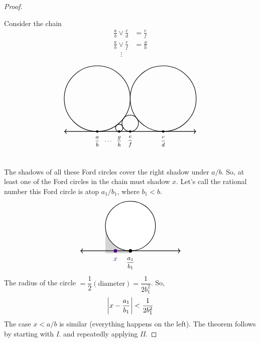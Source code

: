 \begin{proof}
\begin{subproof}
\end{subproof}
\vspace*{0.5em}
\begin{minipage}{0.4\textwidth}
Consider the chain
\vspace*{0.3em}
\begin{align*}
\frac{a}{b} \vee \frac{c}{d} &= \frac{e}{f}\\[0.5em]
\frac{a}{b} \vee \frac{e}{f} &= \frac{g}{h}\\[0.1em]
\quad\vdots
\end{align*}
\end{minipage}
\begin{minipage}{0.6\textwidth}
\[\begin{tikzpicture}[scale=3.3]
    \draw[thick](-2,0.5) circle (0.5);
    \draw[thick](-1,0.5) circle (0.5);
    \draw[thick](-1.5,0.125) circle (0.125);
    \draw[thick](-1.66666,0.0555) circle (0.0555);
    \draw[<->,thick] (-2.5,0)--(-0.5,0);
    \foreach \x in {-2,-1.5,-1.66666,-1}
    {
    \fill (\x,0) circle (0.5pt);
    }
    \node[] at (-2,-0.15) {\footnotesize $\dfrac{a}{b}$};
    \node[] at (-1,-0.15) {\footnotesize $\dfrac{c}{d}$};
    \node[] at (-1.5,-0.15) {\footnotesize $\dfrac{e}{f}$};
    \node[] at (-1.66666,-0.15) {\footnotesize $\dfrac{g}{h}$};
    \node[] at (-1.825,-0.15) {\footnotesize $\cdots$};
\end{tikzpicture}\]
\end{minipage}
\vspace*{0.5em}\\
The shadows of all these Ford circles cover the right shadow under $a/b$. So, at least one of the Ford circles in the chain must shadow $x$. Let's call the rational number this Ford circle is atop $a_1/b_1$, where $b_1 < b$.
\[\begin{tikzpicture}[scale=2.5]
    \draw [draw=none, fill=lightgrey] (-1.5,-0.05) rectangle (-1,0.5);
    \draw[thick,black,fill=white](-1,0.5) circle (0.5);
    \draw[<->,thick] (-2,0)--(0,0);
    \foreach \x in {-1}
    {
    \fill (\x,0) circle (1pt);
    }
    \node[] at (-1,-0.25) {\small $\dfrac{a_1}{b_1}$};
    \fill[color=indigo] (-1.3,0) circle (1pt);
    \node[color=indigo] at (-1.3,-0.17) {$x$};
\end{tikzpicture}\]
The radius of the circle $=\dfrac{1}{2}(\text{diameter}) = \dfrac{1}{2b_1^2}$. So,
\[\left\lvert x - \frac{a_1}{b_1}\right\rvert<\frac{1}{2b_1^2}\]
The case $x< a/b$ is similar (everything happens on the left). The theorem follows by starting with \emph{I.} and repeatedly applying \emph{II.}
\end{proof}


